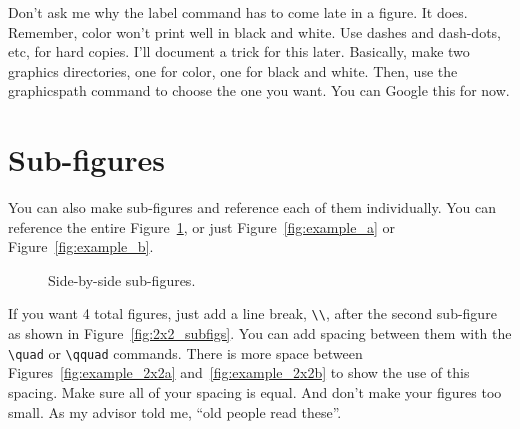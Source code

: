 \documentclass[12pt]{report}
\begin{document}
Don't ask me why the label command has to come late in a figure. It does.  Remember, color won't print well in black and white. Use dashes and dash-dots, etc, for hard copies. I'll document a trick for this later. Basically, make two graphics directories, one for color, one for black and white. Then, use the \textsf{graphicspath} command to choose the one you want. You can Google this for now.

\section{Sub-figures}
You can also make sub-figures and reference each of them individually.  You can reference the entire Figure~\ref{fig:1x2_subfigs}, or just Figure~\ref{fig:example_a} or Figure~\ref{fig:example_b}.
\begin{figure}[!ht]
  \centering
   \caption{Side-by-side sub-figures.}
\label{fig:1x2_subfigs}
\end{figure}


If you want 4 total figures, just add a line break, \verb'\\', after the second sub-figure as shown in Figure~\ref{fig:2x2_subfigs}.  You can add spacing between them with the \verb'\quad' or \verb'\qquad' commands.  There is more space between Figures~\ref{fig:example_2x2a} and~\ref{fig:example_2x2b} to show the use of this spacing.  Make sure all of your spacing is equal.  And don't make your figures too small.  As my advisor told me, ``old people read these''\cite{Mark}.
\end{document}
